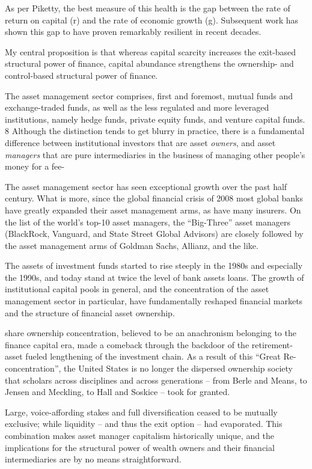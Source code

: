 \documentclass[
]{book}
\begin{document}
As per Piketty, the best measure of this
health is the gap between the rate of return on capital (r) and the rate of economic
growth (g). Subsequent work has shown this gap to have proven
remarkably resilient in recent decades.

My central proposition is that whereas capital scarcity increases the exit-based structural
power of finance, capital abundance strengthens the ownership- and control-based
structural power of finance.

The asset management sector comprises, first and
foremost, mutual funds and exchange-traded funds, as well as the less regulated and
more leveraged institutions, namely hedge funds, private equity funds, and venture
capital funds. 8 Although the distinction tends to get blurry in practice, there is a
fundamental difference between institutional investors that are asset \emph{owners}, and asset
\emph{managers} that are pure intermediaries in the business of managing other people's money
for a fee-

The asset management sector has seen exceptional growth over the
past half century. What is more, since the global financial crisis of 2008 most global
banks have greatly expanded their asset management arms, as have many insurers. On
the list of the world's top-10 asset managers, the ``Big-Three'' asset managers
(BlackRock, Vanguard, and State Street Global Advisors) are closely followed by the
asset management arms of Goldman Sachs, Allianz, and the like.

The assets of investment funds started to rise steeply in the 1980s and especially the
1990s, and today stand at twice the level of bank assets loans.
The growth of institutional capital pools in general, and the concentration of the asset
management sector in particular, have fundamentally reshaped financial markets and the
structure of financial asset ownership.

share ownership concentration,
believed to be an anachronism belonging to the finance capital era, made a comeback
through the backdoor of the retirement-asset fueled lengthening of the investment chain.
As a result of
this ``Great Re-concentration'', the United States is no longer the dispersed ownership
society that scholars across disciplines and across generations -- from Berle and Means,
to Jensen and Meckling, to Hall and Soskice -- took for granted.

Large, voice-affording stakes and full diversification
ceased to be mutually exclusive; while liquidity -- and thus the exit option -- had
evaporated. This combination makes asset manager capitalism historically unique, and
the implications for the structural power of wealth owners and their financial
intermediaries are by no means straightforward.
\end{document}
